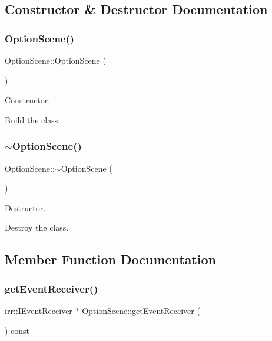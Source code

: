 \subsection{Constructor \& Destructor Documentation}
\mbox{\label{classOptionScene_ac0dfacf1988c5dcfe2520970735fab10}} 
\subsubsection{\texorpdfstring{Option\+Scene()}{OptionScene()}}
{\footnotesize\ttfamily Option\+Scene\+::\+Option\+Scene (\begin{DoxyParamCaption}{ }\end{DoxyParamCaption})}



Constructor. 

Build the class. \mbox{\label{classOptionScene_ab8de71400c4ed7f2a47cedfedb13f327}} 
\subsubsection{\texorpdfstring{$\sim$\+Option\+Scene()}{~OptionScene()}}
{\footnotesize\ttfamily Option\+Scene\+::$\sim$\+Option\+Scene (\begin{DoxyParamCaption}{ }\end{DoxyParamCaption})}



Destructor. 

Destroy the class. 

\subsection{Member Function Documentation}
\mbox{\label{classOptionScene_a8848b9040ee7fd9c1d05a22181c5e053}} 
\subsubsection{\texorpdfstring{get\+Event\+Receiver()}{getEventReceiver()}}
{\footnotesize\ttfamily irr\+::\+I\+Event\+Receiver $\ast$ Option\+Scene\+::get\+Event\+Receiver (\begin{DoxyParamCaption}{ }\end{DoxyParamCaption}) const\hspace{0.3cm}{\ttfamily [virtual]}}



